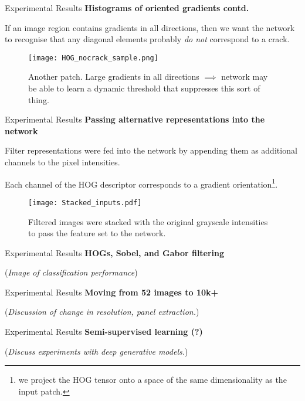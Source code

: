 \documentclass[10pt]{beamer}
\begin{document}
\begin{frame}{Experimental Results}
\textbf{Histograms of oriented gradients contd.}

If an image region contains gradients in all directions, then we want the network to recognise that any diagonal elements probably \emph{do not} correspond to a crack.

\begin{figure}
	\texttt{[image: HOG\_nocrack\_sample.png]}
	\caption{Another patch. Large gradients in all directions $\implies$ network may be able to learn a dynamic threshold that suppresses this sort of thing.}
\end{figure}

\end{frame}

\begin{frame}{Experimental Results}
\textbf{Passing alternative representations into the network}

Filter representations were fed into the network by appending them as additional channels to the pixel intensities.

Each channel of the HOG descriptor corresponds to a gradient orientation\footnote{we project the HOG tensor onto a space of the same dimensionality as the input patch.}.
\begin{figure}
	\texttt{[image: Stacked\_inputs.pdf]}
	\caption{Filtered images were stacked with the original grayscale intensities to pass the feature set to the network.}
\end{figure}
\end{frame}

\begin{frame}{Experimental Results}
\textbf{HOGs, Sobel, and Gabor filtering}

(\emph{Image of classification performance})
\end{frame}

\begin{frame}{Experimental Results}
\textbf{Moving from 52 images to 10k+}

(\emph{Discussion of change in resolution, panel extraction.})
\end{frame}

\begin{frame}{Experimental Results}
\textbf{Semi-supervised learning (?)}

(\emph{Discuss experiments with deep generative models.})
\end{frame}
\end{document}
